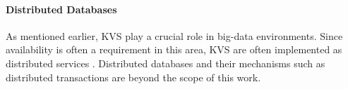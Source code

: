 \paragraph{Distributed Databases}

As mentioned earlier, KVS play a crucial role in big-data environments. Since
availability is often a requirement in this area, KVS are often implemented as
distributed services \cite{decandia2007dynamo, lakshman2010cassandra,
wang2015hydradb}. Distributed databases and their mechanisms such as distributed
transactions are beyond the scope of this work.

